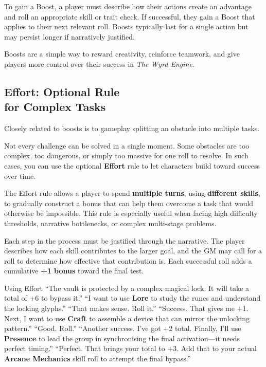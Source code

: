 \begin{multicols}{2}
To gain a Boost, a player must describe how their actions create an advantage and roll an appropriate skill or trait check. If successful, they gain a Boost that applies to their next relevant roll. Boosts typically last for a single action but may persist longer if narratively justified.  

Boosts are a simple way to reward creativity, reinforce teamwork, and give players more control over their success in \textit{The Wyrd Engine}.

\subsection{Effort: Optional Rule\\ for Complex Tasks}

Closely related to boosts is to gameplay splitting an obstacle into multiple tasks.

Not every challenge can be solved in a single moment. Some obstacles are too complex, too dangerous, or simply too massive for one roll to resolve. In such cases, you can use the optional \textbf{Effort} rule to let characters build toward success over time.

The Effort rule allows a player to spend \textbf{multiple turns}, using \textbf{different skills}, to gradually construct a bonus that can help them overcome a task that would otherwise be impossible. This rule is especially useful when facing high difficulty thresholds, narrative bottlenecks, or complex multi-stage problems.

Each step in the process must be justified through the narrative. The player describes how each skill contributes to the larger goal, and the GM may call for a roll to determine how effective that contribution is. Each successful roll adds a cumulative \textbf{+1 bonus} toward the final test.

\begin{ExampleGame}{Using Effort}
    \line[GM]     “The vault is protected by a complex magical lock. It will take a total of +6 to bypass it.” 
    \line[Player] “I want to use \textbf{Lore} to study the runes and understand the locking glyphs.” 
    \line[GM]     “That makes sense. Roll it.” 
    \line[Player] “Success. That gives me +1. Next, I want to use \textbf{Craft} to assemble a device that can mirror the unlocking pattern.” 
    \line[GM]     “Good. Roll.” 
    \line[Player] “Another success. I’ve got +2 total. Finally, I’ll use \textbf{Presence} to lead the group in synchronising the final activation—it needs perfect timing.” 
    \line[GM]     “Perfect. That brings your total to +3. Add that to your actual \textbf{Arcane Mechanics} skill roll to attempt the final bypass.”
\end{ExampleGame}


\end{multicols}
